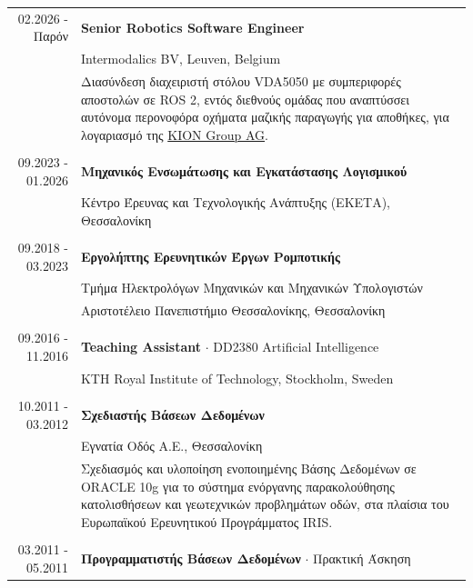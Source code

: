 \documentclass[a4paper,10pt,twoside]{article}
\begin{document}
\begin{tabular}{rp{12cm}}
02.2026 - \hfill Παρόν \hfill & \textbf{Senior Robotics Software Engineer} \\
                              &  Intermodalics BV, Leuven, Belgium \\
                              &  Διασύνδεση διαχειριστή στόλου VDA5050 με συμπεριφορές αποστολών σε ROS 2,
                                 εντός διεθνούς ομάδας που αναπτύσσει αυτόνομα περονοφόρα οχήματα μαζικής
                                 παραγωγής για αποθήκες, για λογαριασμό της
                                 \href{https://www.youtube.com/watch?v=LWqDSMOAeec&t=10s}{KION Group AG}. \\
&\\
09.2023 - \hfill 01.2026 \hfill & \textbf{Μηχανικός Ενσωμάτωσης και Εγκατάστασης Λογισμικού} \\
                              &  Κέντρο Έρευνας και Τεχνολογικής Ανάπτυξης (ΕΚΕΤΑ), Θεσσαλονίκη\\
&\\
09.2018 - 03.2023 & \textbf{Εργολήπτης Ερευνητικών Έργων Ρομποτικής} \\
                  & Τμήμα Ηλεκτρολόγων Μηχανικών και Μηχανικών Υπολογιστών \\
                  & Αριστοτέλειο Πανεπιστήμιο Θεσσαλονίκης, Θεσσαλονίκη\\
&\\
09.2016 - 11.2016 & \textbf{Teaching Assistant} $\cdot$ DD2380 Artificial Intelligence \\
                  & KTH Royal Institute of Technology, Stockholm, Sweden\\
&\\
10.2011 - 03.2012 & \textbf{Σχεδιαστής Βάσεων Δεδομένων} \\
                  & Εγνατία Οδός Α.Ε., Θεσσαλονίκη \\
                  & Σχεδιασμός και υλοποίηση ενοποιημένης Βάσης Δεδομένων σε ORACLE 10g για
                    το σύστημα ενόργανης παρακολούθησης κατολισθήσεων και γεωτεχνικών προβλημάτων οδών,
                    στα πλαίσια του Ευρωπαϊκού Ερευνητικού Προγράμματος IRIS. \\
&\\
03.2011 - 05.2011 & \textbf{Προγραμματιστής Βάσεων Δεδομένων} $\cdot$ Πρακτική Άσκηση \\

\end{tabular}
\end{document}
